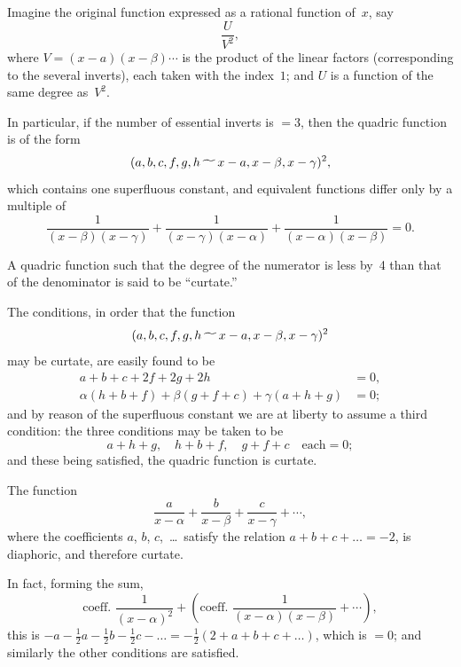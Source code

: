 \documentclass[11pt,a4paper]{book}
\begin{document}
\begin{art}
Imagine the original function expressed as a rational function of~$x$, say
\[
\frac{U}{V^2},
\]
where $V = (x-a)(x-\beta)\cdots$ is the product of the linear factors
(corresponding to the several inverts), each taken with the index~$1$; and
$U$ is a function of the same degree as~$V^2$.
\end{art}

\begin{art}
In particular, if the number of essential inverts is $=3$, then the quadric
function is of the form
\[
(a, b, c, f, g, h \,\raisebox{-.5ex}{$\widetilde{\phantom{aa}}$}\, x-a, x-\beta, x-\gamma)^2,
\]
which contains one superfluous constant, and equivalent functions differ
only by a multiple of
\[
\frac{1}{(x-\beta)(x-\gamma)} + \frac{1}{(x-\gamma)(x-\alpha)} + \frac{1}{(x-\alpha)(x-\beta)} = 0.
\]
\end{art}

\begin{art}
A quadric function such that the degree of the numerator is less by~4
than that of the denominator is said to be ``curtate.''

The conditions, in order that the function
\[
(a, b, c, f, g, h \,\raisebox{-.5ex}{$\widetilde{\phantom{aa}}$}\, x-a, x-\beta, x-\gamma)^2
\]
may be curtate, are easily found to be
\begin{align*}
a + b + c + 2f + 2g + 2h &= 0, \\
\alpha(h + b + f) + \beta(g + f + c) + \gamma(a + h + g) &= 0;
\end{align*}
and by reason of the superfluous constant we are at liberty to assume a
third condition: the three conditions may be taken to be
\[
a + h + g, \quad h + b + f, \quad g + f + c \quad \text{each} = 0;
\]
and these being satisfied, the quadric function is curtate.
\end{art}

\begin{art}
The function
\[
\frac{a}{x-\alpha} + \frac{b}{x-\beta} + \frac{c}{x-\gamma} + \cdots,
\]
where the coefficients $a$, $b$, $c$,~\ldots\ satisfy the relation
$a + b + c + \ldots = -2$, is diaphoric, and therefore curtate.

In fact, forming the sum,
\[
\text{coeff.\ } \frac{1}{(x-\alpha)^2}
+ (\text{coeff.\ } \frac{1}{(x-\alpha)(x-\beta)} + \cdots),
\]
this is $-a - \frac{1}{2}a - \frac{1}{2}b - \frac{1}{2}c - \ldots = -\frac{1}{2}(2 + a + b + c + \ldots)$,
which is $=0$; and similarly the other conditions are satisfied.
\end{art}
\end{document}
